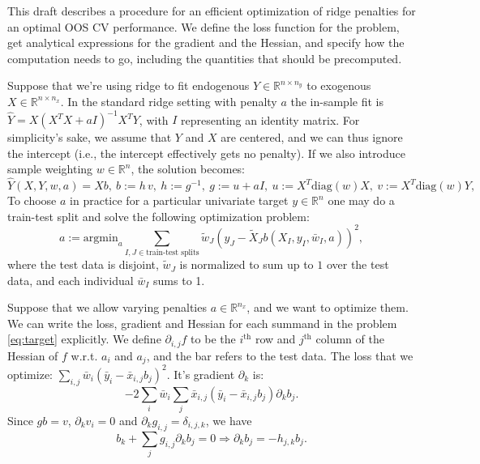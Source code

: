 \documentclass{article}
\newcommand{\argmin}{\textrm{argmin}}
\newcommand{\diag}{\textrm{diag}}
\newcommand{\R}{\mathbb{R}}
\newcommand{\then}{\Rightarrow}
\begin{document}
This draft describes a procedure for an efficient optimization of ridge penalties
for an optimal OOS CV performance. We define the loss function for the problem,
get analytical expressions for the gradient and the Hessian, and specify
how the computation needs to go, including the quantities that should be precomputed.

Suppose that we're using ridge to fit endogenous $Y \in \R^{n \times n_y}$
to exogenous $X \in \R^{n \times n_x}$. In the standard ridge setting with
penalty $a$ the in-sample fit is $\hat{Y} = X (X^T X + a I)^{-1} X^T Y$,
with $I$ representing an identity matrix. For simplicity's sake, we assume that $Y$ and $X$
are centered, and we can thus ignore the intercept (i.e., the intercept effectively gets
no penalty). If we also introduce sample weighting $w \in \R^n$, the solution becomes:
\[
    \hat{Y}(X, Y, w, a)
    = X b, \
    b := h \, v, \
    h := g^{-1}, \
    g := u + a I, \
    u := X^T \diag(w) X, \
    v := X^T \diag(w) Y,
\]
To choose $a$ in practice for a particular univariate target $y \in \R^n$ one may do
a train-test split and solve the following optimization problem:
\begin{equation}\label{eq:target}
    a := \argmin_a \sum_{I, J \in \textrm{train-test splits}}
    \tilde{w}_J (y_J - \tilde{X}_J b(X_I, y_I, \bar{w}_I, a))^2,
\end{equation}
where the test data is disjoint, $\tilde{w}_J$ is normalized to sum up to $1$ over the test data,
and each individual $\bar{w}_I$ sums to 1.

Suppose that we allow varying penalties $a \in \R^{n_x}$, and we want to optimize them.
We can write the loss, gradient and Hessian for each summand in the problem \eqref{eq:target}
explicitly. We define $\partial_{i, j} f$ to be the $i^\textrm{th}$ row and $j^\textrm{th}$ column
of the Hessian of $f$ w.r.t. $a_i$ and $a_j$, and the bar refers to the test data. The loss that
we optimize: $\sum_{i, j}\bar{w}_i (\bar{y}_i - \bar{x}_{i, j} b_j)^2$.
It's gradient $\partial_k$ is:
\[
    -2 \sum_i \bar{w}_i \sum_j \bar{x}_{i, j} (\bar{y}_i - \bar{x}_{i, j} b_j) \partial_k b_j.
\]
Since $gb = v$, $\partial_k v_i = 0$ and $\partial_k g_{i, j} = \delta_{i, j, k}$, we have
\[
    b_k + \sum_j g_{i, j} \partial_k b_j = 0 \then \partial_k b_j = -h_{j, k} b_j.
\]
\end{document}
